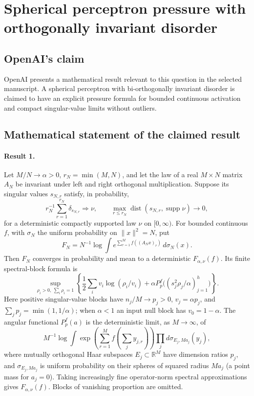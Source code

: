 \documentclass[11pt]{article}
\begin{document}
\section*{Spherical perceptron pressure with orthogonally invariant disorder}

\subsection{OpenAI's claim}
OpenAI presents a mathematical result relevant to this question in the selected manuscript. A spherical perceptron with bi-orthogonally invariant disorder is claimed to have an explicit pressure formula for bounded continuous activation and compact singular-value limits without outliers.

\subsection{Mathematical statement of the claimed result}
\paragraph{Result 1.} Let $M/N\to\alpha>0$, $r_N=\min(M,N)$, and let the law of a real $M\times N$ matrix $A_N$ be invariant under left and right orthogonal multiplication. Suppose its singular values $s_{N,r}$ satisfy, in probability,
\[
 r_N^{-1}\sum_{r=1}^{r_N}\delta_{s_{N,r}}\Longrightarrow\nu,\qquad
 \max_{r\le r_N}\operatorname{dist}(s_{N,r},\operatorname{supp}\nu)\to0,
\]
for a deterministic compactly supported law $\nu$ on $[0,\infty)$. For bounded continuous $f$, with $\sigma_N$ the uniform probability on $\|x\|^2=N$, put
\[
 F_N=N^{-1}\log\int e^{\sum_{r=1}^Mf((A_Nx)_r)}\,d\sigma_N(x).
\]
Then $F_N$ converges in probability and mean to a deterministic $F_{\alpha,\nu}(f)$. Its finite spectral-block formula is
\[
 \sup_{\rho_i>0,\ \sum_i\rho_i=1}
 \left\{\frac12\sum_iv_i\log(\rho_i/v_i)+
 \alpha P_p^f\bigl((s_j^2\rho_j/\alpha)_{j=1}^h\bigr)\right\}.
\]
Here positive singular-value blocks have $n_j/M\to p_j>0$, $v_j=\alpha p_j$, and $\sum_jp_j=\min(1,1/\alpha)$; when $\alpha<1$ an input null block has $v_0=1-\alpha$. The angular functional $P_p^f(a)$ is the deterministic limit, as $M\to\infty$, of
\[
 M^{-1}\log\int\exp\left(\sum_{r=1}^Mf\left(\sum_jy_{j,r}\right)\right)
 \prod_jd\sigma_{E_j,Ma_j}(y_j),
\]
where mutually orthogonal Haar subspaces $E_j\subset\mathbb R^M$ have dimension ratios $p_j$, and $\sigma_{E_j,Ma_j}$ is uniform probability on their spheres of squared radius $Ma_j$ (a point mass for $a_j=0$). Taking increasingly fine operator-norm spectral approximations gives $F_{\alpha,\nu}(f)$. Blocks of vanishing proportion are omitted.
\end{document}
